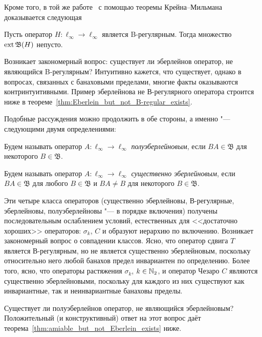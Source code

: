 Кроме того, в той же работе~\cite{alekhno2018invariant}
с помощью теоремы Крейна--Мильмана~\cite[Theorem  9.14]{aliprantis2006positive}
доказывается следующая
\begin{lemma}
	Пусть оператор $H:\ell_\infty\to\ell_\infty$ является B-регулярным.
	Тогда множество $\operatorname{ext}\mathfrak{B}(H)$ непусто.
\end{lemma}

Возникает закономерный вопрос: существует ли эберлейнов оператор, не являющийся B-регулярным?
Интуитивно кажется, что существует, однако в вопросах, связанных с банаховыми пределами,
многие факты оказываются контринтуитивными.
Пример эберлейнова не В-регулярного оператора строится ниже
в теореме~\ref{thm:Eberlein_but_not_B-regular_exists}.

Подобные рассуждения можно продолжить в обе стороны, а именно "--- следующими двумя определениями:

\begin{definition}
	Будем называть оператор $A:\ell_\infty \to \ell_\infty$ \emph{полуэберлейновым}, если $BA\in\mathfrak B$ для некоторого $B\in\mathfrak B$.
\end{definition}

\begin{definition}
	Будем называть оператор $A:\ell_\infty \to \ell_\infty$ \emph{существенно эберлейновым}, если $BA\in\mathfrak B$ для любого $B\in\mathfrak B$ и $BA\ne B$ для некоторого $B\in\mathfrak B$.
\end{definition}

Эти четыре класса операторов (существенно эберлейновы, В-регулярные, эберлейновы, полуэберлейновы "--- в порядке включения)
получены последовательным ослаблением условий, естественных для <<достаточно хороших>> операторов:
$\sigma_k$, $C$
и образуют иерархию по включению.
Возникает закономерный вопрос о совпадении классов.
Ясно, что оператор сдвига $T$ является В-регулярным, но не является существенно эберлейновым, поскольку относительно него любой банахов предел инвариантен по определению.
Более того, ясно, что операторы растяжения $\sigma_k$, $k\in\mathbb{N}_2$, и оператор Чезаро $C$ являются существенно эберлейновыми,
поскольку для каждого из них существуют как инвариантные, так и неинвариантные банаховы пределы.

Существует ли полуэберлейнов оператор, не являющийся эберлейновым?
Положительный (и конструктивный) ответ на этот вопрос даёт теорема~\ref{thm:amiable_but_not_Eberlein_exists} ниже.



